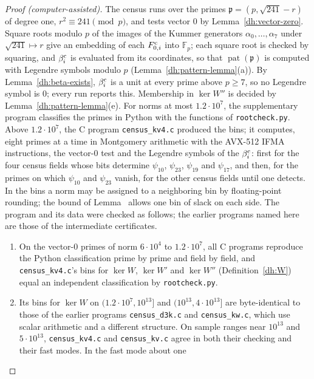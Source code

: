 \begin{proof}[Proof (computer-assisted)]
The census runs over the primes $\mathfrak p=(p,\sqrt{241}-r)$ of degree
one, $r^2\equiv241\pmod p$, and tests vector $0$ by
Lemma~\ref{dh:vector-zero}. Square roots modulo $p$ of the images of the
Kummer generators $\alpha_0,\dots,\alpha_7$ under $\sqrt{241}\mapsto r$ give
an embedding of each $F^{\rm c}_{0,i}$ into $\mathbb F_p$; each square root is
checked by squaring, and $\beta^{\rm c}_i$ is evaluated from its coordinates, so that
$\operatorname{pat}(\mathfrak p)$ is computed with Legendre symbols modulo
$p$ (Lemma~\ref{dh:pattern-lemma}(a)). By Lemma~\ref{dh:beta-exists},
$\beta^{\rm c}_i$ is a unit at every prime above $p\ge7$, so no Legendre symbol is
$0$; every run reports this.
Membership in $\ker W''$ is decided by Lemma~\ref{dh:pattern-lemma}(e). For
norms at most $1.2\cdot10^7$, the supplementary program
 classifies the primes in Python with
the functions of \texttt{rootcheck.py}. Above $1.2\cdot10^7$, the C program
\texttt{census\_kv4.c} produced the bins; it computes, eight primes
at a time in Montgomery arithmetic with the AVX-512 IFMA instructions, the
vector-$0$ test and the Legendre symbols of the $\beta^{\rm c}_i$: first for the four
census fields whose bits determine $\psi_{10}$, $\psi_{23}$, $\psi_{19}$ and
$\psi_{17}$, and then, for the primes on which $\psi_{10}$ and $\psi_{23}$
vanish, for the other census fields until one detects. In the bins a norm
may be assigned to a neighboring bin by floating-point rounding; the bound of
Lemma~ allows one bin of slack on each side. The program and
its data were checked as follows; the earlier programs named here are those
of the intermediate certificates.
\begin{enumerate}
\item[(1)] On the vector-$0$ primes of norm $6\cdot10^4$ to $1.2\cdot10^7$, all
 C programs reproduce the Python classification prime by prime and field by
 field, and \texttt{census\_kv4.c}'s bins for $\ker W$, $\ker W'$ and
 $\ker W''$ (Definition~\ref{dh:W}) equal an independent classification by
 \texttt{rootcheck.py}.
\item[(2)] Its bins for $\ker W$ on $(1.2\cdot10^7,10^{13}]$ and
 $(10^{13},4\cdot10^{13}]$ are byte-identical to those of the earlier programs
 \texttt{census\_d3k.c} and \texttt{census\_kw.c}, which use scalar
 arithmetic and a different structure. On sample ranges near $10^{13}$ and
 $5\cdot10^{13}$, \texttt{census\_kv4.c} and \texttt{census\_kv.c} agree in
 both their checking and their fast modes. In the fast mode about one

\end{enumerate}
\end{proof}
